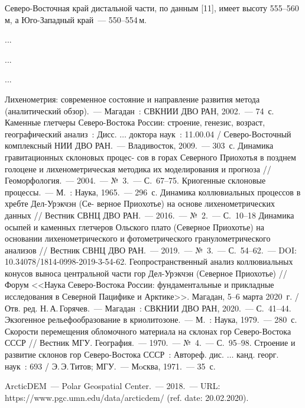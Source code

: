 Северо-Восточная край дистальной части, по данным [11], имеет высоту 555--560\,м, а Юго-Западный край~--- 550--554\,м.

...

...

...



\begin{thebibliography}{99}
\bibitem{} Лихенометрия: современное состояние и направление развития
метода (аналитический обзор).~--- Магадан~: СВКНИИ ДВО РАН, 2002.~--- 74~с.
\bibitem{} Каменные глетчеры Северо-Востока России: строение, генезис,
возраст, географический анализ~: Дисс. $\dots$ доктора наук~: 11.00.04 / Северо-Восточный комплексный НИИ ДВО РАН.~--- Владивосток, 2009.~--- 303~с.
\bibitem{} Динамика гравитационных склоновых процес-
сов в горах Северного Приохотья в позднем голоцене и лихенометрическая методика их моделирования и прогноза // Геоморфология.~--- 2004.~--- №~3.~--- С.~67--75.
\bibitem{} Криогенные склоновые процессы.~--- М.~: Наука, 1965.~--- 296~с.
\bibitem{} Динамика коллювиальных процессов в хребте Дел-Урэкчэн (Се-
верное Приохотье) на основе лихенометрических данных // Вестник СВНЦ ДВО РАН.~--- 2016.~--- №~2.~--- С.~10--18
\bibitem{} Динамика осыпей и каменных глетчеров Ольского плато (Северное Приохотье) на основании лихенометрического и фотометрического гранулометрического анализов // Вестник СВНЦ ДВО РАН.~--- 2019.~--- №~3.~--- С.~54–62.~--- DOI: 10.34078/1814-0998-2019-3-54-62.
\bibitem{} Геопространственный анализ коллювиальных конусов выноса центральной части гор Дел-Урэкчэн (Северное Приохотье) // Форум <<Наука Северо-Востока России: фундаментальные и прикладные исследования в Северной Пацифике и Арктике>>. Магадан, 5--6 марта 2020~г. / Отв. ред. Н.\,А.\,Горячев.~--- Магадан~: СВКНИИ ДВО РАН, 2020.~--- С.~41--44.
\bibitem{} Экзогенное рельефообразование в криолитозоне.~--- М.~:
Наука, 1979.~--- 280~с.
\bibitem{} Скорости перемещения обломочного материала на склонах гор
Северо-Востока СССР // Вестник МГУ. География.~--- 1970.~--- №~4.~--- С.~95--98.
\bibitem{} Строение и развитие склонов гор Северо-Востока СССР~: Автореф.
дис. $\dots$ канд. георг. наук~: 693 / Э.\,Э.\,Титов; МГУ.~--- Мoсква, 1971.~--- 35~с.

\bibitem{}ArcticDEM~--- Polar Geospatial Center.~--- 2018.~--- URL: https://www.pgc.umn.edu/data/arcticdem/ (ref. date: 20.02.2020).

\end{thebibliography}
\thispagestyle{empty}
